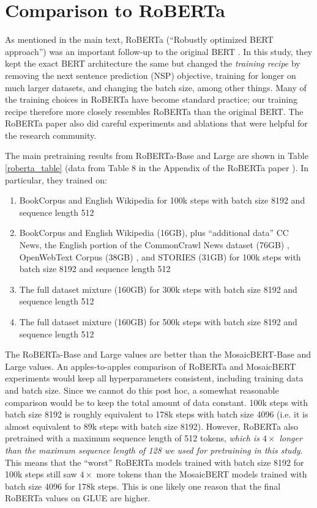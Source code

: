 \section{Comparison to RoBERTa}

As mentioned in the main text, RoBERTa (``Robustly optimized BERT approach'') was an important follow-up to the original BERT \citep{liu2019roberta}. In this study, they kept the exact BERT architecture the same but changed the \textit{training recipe} by removing the next sentence prediction (NSP) objective, training for longer on much larger datasets, and changing the batch size, among other things. Many of the training choices in RoBERTa have become standard practice; our training recipe therefore more closely resembles RoBERTa than the original BERT. The RoBERTa paper also did careful experiments and ablations that were helpful for the research community.

The main pretraining results from RoBERTa-Base and Large are shown in Table \ref{roberta_table} (data from Table 8 in the Appendix of the RoBERTa paper \citep{liu2019roberta}). In particular, they trained on:
\begin{enumerate}
    \item BookCorpus \citep{zhu2015aligning} and English Wikipedia for 100k steps with batch size 8192 and sequence length 512
    \item BookCorpus  \citep{zhu2015aligning} and English Wikipedia (16GB), plus ``additional data'' CC News, the English portion of the CommonCrawl News dataset (76GB) \citep{nagel2016common}, OpenWebText Corpus (38GB) \citep{Gokaslan2019OpenWeb}, and STORIES (31GB) \citep{trinh2018simple} for 100k steps with batch size 8192 and sequence length 512
    \item The full dataset mixture (160GB) for 300k steps with batch size 8192 and sequence length 512
    \item The full dataset mixture (160GB) for 500k steps with batch size 8192 and sequence length 512
\end{enumerate}

The RoBERTa-Base and Large values are better than the MosaicBERT-Base and Large values.  An apples-to-apples comparison of RoBERTa and MosaicBERT experiments would keep all hyperparameters consistent, including training data and batch size. Since we cannot do this post hoc, a somewhat reasonable comparison would be to keep the total amount of data constant. 100k steps with batch size 8192 is roughly equivalent to 178k steps with batch size 4096 (i.e. it is almost equivalent to 89k steps with batch size 8192). However, RoBERTa also pretrained with a maximum sequence length of 512 tokens,\textit{ which is $4\times$ longer than the maximum sequence length of 128 we used for pretraining in this study}. This means that the ``worst'' RoBERTa models trained with batch size 8192 for 100k steps still saw $4\times$ more tokens than the MosaicBERT models trained with batch size 4096 for 178k steps.  This is one likely one reason that the final RoBERTa values on GLUE are higher. 

